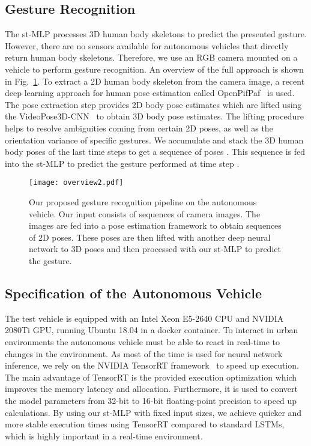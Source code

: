 \documentclass[letterpaper, 10 pt, conference]{ieeeconf}
\begin{document}
\subsection{Gesture Recognition}
\label{subsec:gesture_recognition}
The st-MLP processes 3D human body skeletons to predict the presented gesture. However, there are no sensors available for autonomous vehicles that directly return human body skeletons. Therefore, we use an RGB camera mounted on a vehicle to perform gesture recognition. An overview of the full approach is shown in Fig.~\ref{fig:real_world_demo}. To extract a 2D human body skeleton from the camera image, a recent deep learning approach for human pose estimation called OpenPifPaf~\cite{Kreiss_2019_CVPR} is used. The pose extraction step provides 2D body pose estimates which are lifted using the VideoPose3D-CNN~\cite{pavllo:videopose3d:2019} to obtain 3D body pose estimates. The lifting procedure helps to resolve ambiguities coming from certain 2D poses, as well as the orientation variance of specific gestures. We accumulate and stack the 3D human body poses  of the last  time steps to get a sequence of poses . This sequence is fed into the st-MLP to predict the gesture  performed at time step .

\begin{figure}
    \vspace{2mm}
    \centering
    \texttt{[image: overview2.pdf]}
    \caption{Our proposed gesture recognition pipeline on the autonomous vehicle. Our input consists of sequences of camera images. The images are fed into a pose estimation framework to obtain sequences of 2D poses. These poses are then lifted with another deep neural network to 3D poses and then processed with our st-MLP to predict the gesture.}
    \label{fig:real_world_demo}
\end{figure}


\subsection{Specification of the Autonomous Vehicle}
\label{subsec:car_specs}
The test vehicle is equipped with an Intel Xeon E5-2640 CPU and NVIDIA 2080Ti GPU, running Ubuntu 18.04 in a docker container. To interact in urban environments the autonomous vehicle must be able to react in real-time to changes in the environment. As most of the time is used for neural network inference, we rely on the NVIDIA TensorRT framework~\cite{tensorrt} to speed up execution. The main advantage of TensorRT is the provided execution optimization which improves the memory latency and allocation. Furthermore, it is used to convert the model parameters from 32-bit to 16-bit floating-point precision to speed up calculations. By using our st-MLP with fixed input sizes, we achieve quicker and more stable execution times using TensorRT compared to standard LSTMs, which is highly important in a real-time environment.
\end{document}
